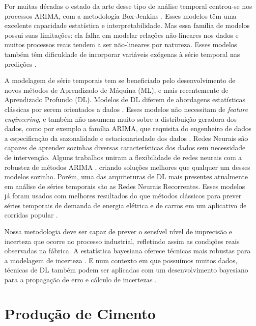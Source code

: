 Por muitas décadas o estado da arte desse tipo de análise temporal centrou-se
nos processos ARIMA, com a metodologia Box-Jenkins \citep{arima}.
Esses modelos têm uma excelente capacidade estatística e interpretabilidade.
Mas essa família de modelos possui suas limitações:
ela falha em modelar relações não-lineares nos dados \citep{forecasting} e 
muitos processos reais tendem a ser não-lineares por natureza.
Esses modelos também têm dificuldade de incorporar variáveis exógenas à série temporal nas predições \citep{ubertime}.


A modelagem de série temporais tem se beneficiado pelo desenvolvimento de novos
métodos de Aprendizado de Máquina (ML), e mais recentemente de Aprendizado Profundo (DL).
Modelos de DL diferem de abordagens estatísticas clássicas por serem orientados
a dados \citep{dlbook}.
Esses modelos não necessitam de \textit{feature engineering}, e também não
assumem muito sobre a distribuição geradora dos dados, como por exemplo a
família ARIMA, que requisita do engenheiro de dados a especificação da
sazonalidade e estacionariedade dos dados \citep{arima}.
Redes Neurais são capazes de aprender sozinhas diversas características dos dados sem necessidade de intervenção. 
Alguns trabalhos uniram a flexibilidade de redes neurais com a robustez de
métodos ARIMA \citep{DIAZROBLES20088331,KHASHEI2010479},
criando soluções melhores que qualquer um desses modelos sozinho. Porém, uma das
arquiteturas de DL mais presentes atualmente em análise de séries temporais
são as Redes Neurais Recorrentes. Esses modelos já foram usados com
melhores resultados do que métodos clássicos para prever séries temporais de
demanda de energia elétrica e de carros em um aplicativo de corridas popular
\citep{energylstm,ubertime}.


Nossa metodologia deve ser capaz de prever o sensível nível de imprecisão e
incerteza que ocorre no processo industrial,
refletindo assim as condições reais observadas na fábrica. A estatística bayesiana oferece técnicas
mais robustas para a modelagem de incerteza \citep{bayesml}. E num contexto em
que possuímos muitos dados, técnicas de DL também podem ser aplicadas com um desenvolvimento bayesiano para a propagação de erro e cálculo de incertezas \citep{ubertime,Gal2016Uncertainty}. 



\section{Produção de Cimento}
\label{sec:producao}

